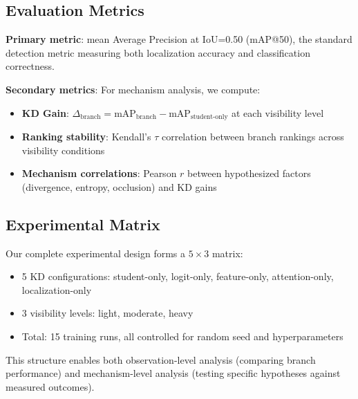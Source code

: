 \subsection{Evaluation Metrics}

\textbf{Primary metric}: mean Average Precision at IoU=0.50 (mAP@50), the standard detection metric measuring both localization accuracy and classification correctness.

\textbf{Secondary metrics}: For mechanism analysis, we compute:
\begin{itemize}
    \item \textbf{KD Gain}: $\Delta_{\text{branch}} = \text{mAP}_{\text{branch}} - \text{mAP}_{\text{student-only}}$ at each visibility level
    \item \textbf{Ranking stability}: Kendall's $\tau$ correlation between branch rankings across visibility conditions
    \item \textbf{Mechanism correlations}: Pearson $r$ between hypothesized factors (divergence, entropy, occlusion) and KD gains
\end{itemize}

\subsection{Experimental Matrix}

Our complete experimental design forms a $5 \times 3$ matrix:
\begin{itemize}
    \item 5 KD configurations: student-only, logit-only, feature-only, attention-only, localization-only
    \item 3 visibility levels: light, moderate, heavy
    \item Total: 15 training runs, all controlled for random seed and hyperparameters
\end{itemize}

This structure enables both observation-level analysis (comparing branch performance) and mechanism-level analysis (testing specific hypotheses against measured outcomes).
